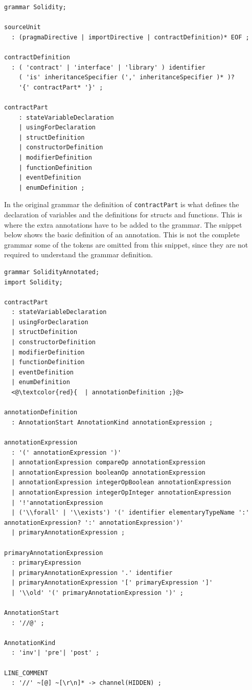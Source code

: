 \documentclass[a4paper]{article}
\begin{document}
\begin{lstlisting}[basicstyle=\ttfamily]
grammar Solidity;

sourceUnit
  : (pragmaDirective | importDirective | contractDefinition)* EOF ;

contractDefinition
  : ( 'contract' | 'interface' | 'library' ) identifier
    ( 'is' inheritanceSpecifier (',' inheritanceSpecifier )* )?
    '{' contractPart* '}' ;

contractPart
    : stateVariableDeclaration
    | usingForDeclaration
    | structDefinition
    | constructorDefinition
    | modifierDefinition
    | functionDefinition
    | eventDefinition
    | enumDefinition ;
\end{lstlisting}
In the original grammar the definition of \texttt{contractPart} is what defines the declaration of variables and the definitions for structs and functions. This is where the extra annotations have to be added to the grammar. The snippet below shows the basic definition of an annotation. This is not the complete grammar some of the tokens are omitted from this snippet, since they are not required to understand the grammar definition.
\begin{lstlisting}[basicstyle=\ttfamily]
grammar SolidityAnnotated;
import Solidity;

contractPart
  : stateVariableDeclaration
  | usingForDeclaration
  | structDefinition
  | constructorDefinition
  | modifierDefinition
  | functionDefinition
  | eventDefinition
  | enumDefinition 
  <@\textcolor{red}{  | annotationDefinition ;}@>

annotationDefinition
  : AnnotationStart AnnotationKind annotationExpression ;

annotationExpression
  : '(' annotationExpression ')'
  | annotationExpression compareOp annotationExpression
  | annotationExpression booleanOp annotationExpression
  | annotationExpression integerOpBoolean annotationExpression
  | annotationExpression integerOpInteger annotationExpression
  | '!'annotationExpression
  | ('\\forall' | '\\exists') '(' identifier elementaryTypeName ':' annotationExpression? ':' annotationExpression')'
  | primaryAnnotationExpression ;

primaryAnnotationExpression
  : primaryExpression 
  | primaryAnnotationExpression '.' identifier
  | primaryAnnotationExpression '[' primaryExpression ']'
  | '\\old' '(' primaryAnnotationExpression ')' ;

AnnotationStart
  : '//@' ;

AnnotationKind
  : 'inv'| 'pre'| 'post' ;

LINE_COMMENT 
  : '//' ~[@] ~[\r\n]* -> channel(HIDDEN) ;
\end{lstlisting}
\end{document}
